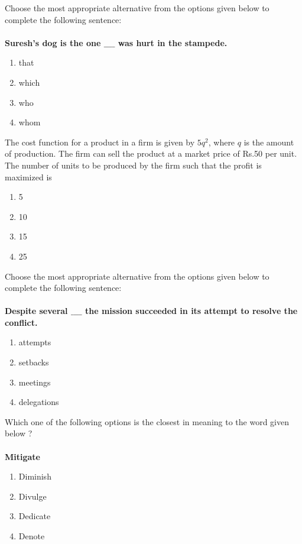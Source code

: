 \item Choose the most appropriate alternative from the options given below to complete the following sentence:\\\\
\textbf{Suresh's dog is the one $\_\_\_\_$ was hurt in the stampede.}
 \begin{enumerate}
     \item that
     \item which
     \item who
     \item whom \\
 \end{enumerate}
\item The cost function for a product in a firm is given by $5q^2$, where $q$ is the amount of production. The firm can sell the product at a market price of Rs.50 per unit. The number of units to be produced by the firm such that the profit is maximized is
\begin{enumerate}
   \item 5
   \item 10
   \item 15
   \item 25 \\
\end{enumerate}
\item Choose the most appropriate alternative from the options given below to complete the following sentence:\\\\
\textbf{Despite several $\_\_\_\_$ the mission succeeded in its attempt to resolve the conflict.}
\begin{enumerate}
    \item attempts
    \item setbacks
    \item meetings
    \item delegations \\
\end{enumerate}
\item Which one of the following options is the closest in meaning to the word given below ? \\\\
\textbf{Mitigate}
\begin{enumerate}
    \item Diminish
    \item Divulge
    \item Dedicate
    \item Denote \\
 \end{enumerate}
